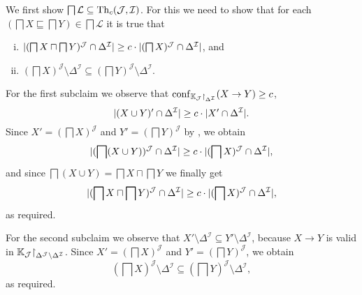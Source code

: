 \begin{Proof}
  We first show $\bigsqcap \mathcal{L} \subseteq \operatorname{Th}_{c}(\mathcal{J}, \mathcal{I})$.  For
  this we need to show that for each $(\bigsqcap X \sqsubseteq \bigsqcap Y) \in \bigsqcap
  \mathcal{L}$ it is true that
  \begin{enumerate}[i. ]
  \item $\lvert (\bigsqcap X \sqcap \bigsqcap Y)^{\mathcal{J}} \cap \Delta^{\mathcal{I}} \rvert
    \ge c \cdot \lvert (\bigsqcap X)^{\mathcal{J}} \cap \Delta^{\mathcal{I}} \rvert$, and
  \item $(\bigsqcap X)^{\mathcal{J}} \setminus \Delta^{\mathcal{I}} \subseteq (\bigsqcap
    Y)^{\mathcal{J}} \setminus \Delta^{\mathcal{I}}$.
  \end{enumerate}
  For the first subclaim we observe that $\operatorname{conf}_{{\mathbb{K}}_{\mathcal{J}}\mathord{\upharpoonright}_{\Delta^{\mathcal{I}}}}(X \to Y) \ge c$, \ie
  \begin{equation*}
    \lvert (X \cup Y)' \cap \Delta^{\mathcal{I}} \rvert \ge c \cdot \lvert X' \cap
      \Delta^{\mathcal{I}} \rvert.
  \end{equation*}
  Since $X' = (\bigsqcap X)^{\mathcal{J}}$ and $Y' = (\bigsqcap Y)^{\mathcal{J}}$ by
  , we obtain
  \begin{equation*}
    \lvert (\bigsqcap (X \cup Y))^{\mathcal{J}} \cap \Delta^{\mathcal{I}} \rvert \ge c \cdot
    \lvert (\bigsqcap X)^{\mathcal{J}} \cap \Delta^{\mathcal{I}} \rvert,
  \end{equation*}
  and since $\bigsqcap (X \cup Y) = \bigsqcap X \sqcap \bigsqcap Y$ we finally get
  \begin{equation*}
    \lvert (\bigsqcap X \sqcap \bigsqcap Y)^{\mathcal{J}} \cap \Delta^{\mathcal{I}} \rvert \ge
    c \cdot \lvert (\bigsqcap X)^{\mathcal{J}} \cap \Delta^{\mathcal{I}} \rvert,
  \end{equation*}
  as required.

  For the second subclaim we observe that $X' \setminus \Delta^{\mathcal{I}} \subseteq Y'
  \setminus \Delta^{\mathcal{I}}$, because $X \to Y$ is valid in ${\mathbb{K}}_{\mathcal{J}}\mathord{\upharpoonright}_{\Delta^{\mathcal{J}} \setminus \Delta^{\mathcal{I}}}$.
  Since $X' = (\bigsqcap X)^{\mathcal{J}}$ and $Y' = (\bigsqcap Y)^{\mathcal{J}}$, we
  obtain
  \begin{equation*}
    (\bigsqcap X)^{\mathcal{J}} \setminus \Delta^{\mathcal{I}} \subseteq (\bigsqcap
    Y)^{\mathcal{J}} \setminus \Delta^{\mathcal{I}},
  \end{equation*}
  as required.


\end{Proof}
